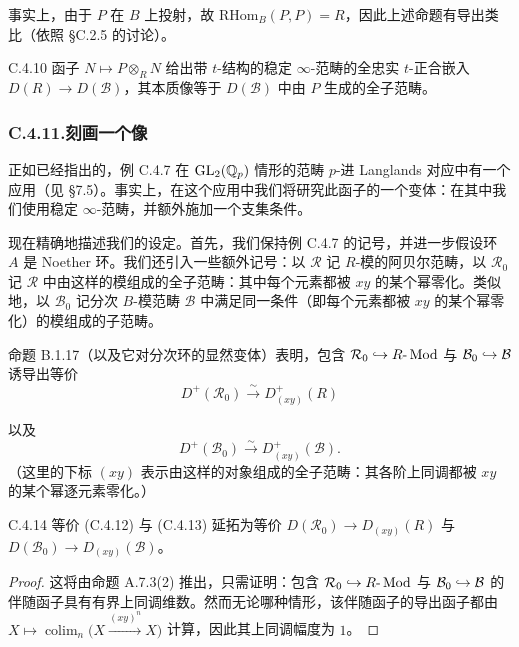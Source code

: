 事实上，由于 $P$ 在 $B$ 上投射，故 $\mathrm{RHom}_B(P,P)=R$，因此上述命题有导出类比（依照 §C.2.5 的讨论）。

\begin{prop}{C.4.10}\label{thm:a4-19-15}
函子 $N\mapsto P\otimes_R N$ 给出带 $t$-结构的稳定 $\infty$-范畴的全忠实 $t$-正合嵌入 $D(R)\to D(\mathcal B)$，其本质像等于 $D(\mathcal B)$ 中由 $P$ 生成的全子范畴。
\end{prop}

\subsubsection*{C.4.11.\quad 刻画一个像}

正如已经指出的，例 C.4.7 在 $\mathrm{GL}_2(\mathbb{Q}_p)$ 情形的范畴 $p$-进 Langlands 对应中有一个应用（见 §7.5）。事实上，在这个应用中我们将研究此函子的一个变体：在其中我们使用稳定 $\infty$-范畴，并额外施加一个支集条件。

现在精确地描述我们的设定。首先，我们保持例 C.4.7 的记号，并进一步假设环 $A$ 是 Noether 环。我们还引入一些额外记号：以 $\mathcal R$ 记 $R$-模的阿贝尔范畴，以 $\mathcal R_0$ 记 $\mathcal R$ 中由这样的模组成的全子范畴：其中每个元素都被 $xy$ 的某个幂零化。类似地，以 $\mathcal B_0$ 记分次 $B$-模范畴 $\mathcal B$ 中满足同一条件（即每个元素都被 $xy$ 的某个幂零化）的模组成的子范畴。

命题 B.1.17（以及它对分次环的显然变体）表明，包含 $\mathcal R_0\hookrightarrow R\text{-}\operatorname{Mod}$ 与 $\mathcal B_0\hookrightarrow\mathcal B$ 诱导出等价
\begin{equation}\tag{C.4.12}\label{eq:a4-19-6}
D^+(\mathcal R_0)\xrightarrow{\sim}D^+_{(xy)}(R)
\end{equation}


以及
\begin{equation}\tag{C.4.13}\label{eq:a4-19-7}
D^+(\mathcal B_0)\xrightarrow{\sim}D^+_{(xy)}(\mathcal B).
\end{equation}
（这里的下标 $(xy)$ 表示由这样的对象组成的全子范畴：其各阶上同调都被 $xy$ 的某个幂逐元素零化。）

\begin{lem}{C.4.14}\label{thm:a4-19-16}
等价 (C.4.12) 与 (C.4.13) 延拓为等价 $D(\mathcal R_0)\to D_{(xy)}(R)$ 与 $D(\mathcal B_0)\to D_{(xy)}(\mathcal B)$。
\end{lem}

\begin{proof}
这将由命题 A.7.3(2) 推出，只需证明：包含 $\mathcal R_0\hookrightarrow R\text{-}\operatorname{Mod}$ 与 $\mathcal B_0\hookrightarrow\mathcal B$ 的伴随函子具有有界上同调维数。然而无论哪种情形，该伴随函子的导出函子都由 $X\mapsto\operatorname*{colim}_n\bigl(X\xrightarrow{(xy)^n}X\bigr)$ 计算，因此其上同调幅度为 $1$。
\end{proof}

